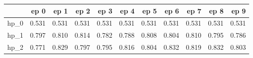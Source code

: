 \begin{tabular}{lrrrrrrrrrr}
\toprule
{} &   ep 0 &   ep 1 &   ep 2 &   ep 3 &   ep 4 &   ep 5 &   ep 6 &   ep 7 &   ep 8 &   ep 9 \\
\midrule
hp\_0 &  0.531 &  0.531 &  0.531 &  0.531 &  0.531 &  0.531 &  0.531 &  0.531 &  0.531 &  0.531 \\
hp\_1 &  0.797 &  0.810 &  0.814 &  0.782 &  0.788 &  0.808 &  0.804 &  0.810 &  0.795 &  0.786 \\
hp\_2 &  0.771 &  0.829 &  0.797 &  0.795 &  0.816 &  0.804 &  0.832 &  0.819 &  0.832 &  0.803 \\
\bottomrule
\end{tabular}
